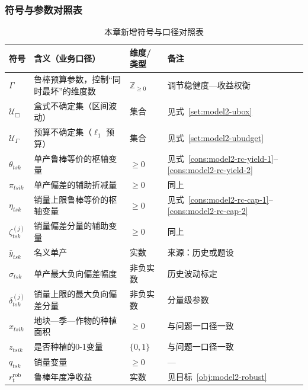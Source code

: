 \subsubsection{符号与参数对照表}
\begin{table}[htbp]
  \centering
  \footnotesize
  \setlength{\tabcolsep}{2pt}
  \begin{tabular}{@{}>{\raggedright\arraybackslash}p{} >{\raggedright\arraybackslash}p{} >{\raggedright\arraybackslash}p{} >{\raggedright\arraybackslash}p{}@{}}
    \toprule
    符号 & 含义（业务口径） & 维度/类型 & 备注 \\
    \midrule
    $\Gamma$ & 鲁棒预算参数，控制“同时最坏”的维度数 & $\mathbb{Z}_{\ge 0}$ & 调节稳健度—收益权衡 \\
    $\mathcal{U}_{\Box}$ & 盒式不确定集（区间波动） & 集合 & 见式~\eqref{set:model2-ubox} \\
    $\mathcal{U}_{\Gamma}$ & 预算不确定集（$\ell_1$ 预算） & 集合 & 见式~\eqref{set:model2-ubudget} \\
    $\theta_{tsk}$ & 单产鲁棒等价的枢轴变量 & $\ge 0$ & 见式~\eqref{cons:model2-rc-yield-1}--\eqref{cons:model2-rc-yield-2} \\
    $\pi_{tsik}$ & 单产偏差的辅助折减量 & $\ge 0$ & 同上 \\
    $\eta_{tsk}$ & 销量上限鲁棒等价的枢轴变量 & $\ge 0$ & 见式~\eqref{cons:model2-rc-cap-1}--\eqref{cons:model2-rc-cap-2} \\
    $\zeta_{tsk}^{(j)}$ & 销量偏差分量的辅助变量 & $\ge 0$ & 同上 \\
    $\bar{y}_{tsk}$ & 名义单产 & 实数 & 来源：历史或题设 \\
    $\sigma_{tsk}$ & 单产最大负向偏差幅度 & 非负实数 & 历史波动标定 \\
    $\delta_{tsk}^{(j)}$ & 销量上限的最大负向偏差分量 & 非负实数 & 分量级参数 \\
    $x_{tsik}$ & 地块—季—作物的种植面积 & $\ge 0$ & 与问题一口径一致 \\
    $z_{tsik}$ & 是否种植的0-1变量 & $\{0,1\}$ & 与问题一口径一致 \\
    $q_{tsk}$ & 销量变量 & $\ge 0$ & — \\
    $r_t^{\mathrm{rob}}$ & 鲁棒年度净收益 & 实数 & 见目标~\eqref{obj:model2-robust} \\
    \bottomrule
  \end{tabular}
  \caption{本章新增符号与口径对照表}
  \label{tab:model2-symbols}
\end{table}

